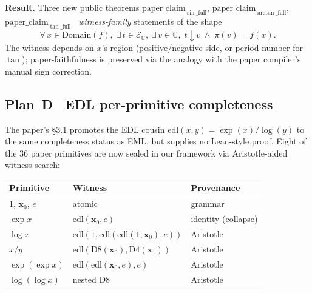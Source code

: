 \documentclass[11pt]{article}
\newcommand{\EsetC}{\mathcal{E}_{\mathbb{C}}}
\theoremstyle{plain}
\theoremstyle{definition}
\begin{document}
\noindent\textbf{Result.} Three new public theorems
$\mathrm{paper\_claim}_{\sin\_\mathrm{full}}$,
$\mathrm{paper\_claim}_{\arctan\_\mathrm{full}}$,
$\mathrm{paper\_claim}_{\tan\_\mathrm{full}}$ \textemdash\
\emph{witness-family} statements of the shape
\[
  \forall\, x \in \mathrm{Domain}(f),\;
  \exists\, t \in \EsetC,\;
  \exists\, v \in \mathbb{C},\;
  t \downarrow v \;\wedge\; \pi(v) = f(x).
\]
The witness depends on $x$'s region (positive/negative side, or
period number for $\tan$); paper-faithfulness is preserved via the
analogy with the paper compiler's manual sign correction.

\subsection*{Plan~D \textemdash\ EDL per-primitive completeness}

The paper's \S3.1 promotes the EDL cousin
$\mathrm{edl}(x, y) = \exp(x) / \log(y)$ to the same completeness
status as EML, but supplies no Lean-style proof. Eight of the $36$
paper primitives are now sealed in our framework via Aristotle-aided
witness search:

\begin{center}
\begin{tabular}{l l l}
\toprule
\textbf{Primitive} & \textbf{Witness} & \textbf{Provenance} \\
\midrule
$1$, $\mathbf{x}_0$, $e$       & atomic                                                         & grammar \\
$\exp x$                       & $\mathrm{edl}(\mathbf{x}_0, e)$                                & identity (collapse) \\
$\log x$                       & $\mathrm{edl}(1, \mathrm{edl}(\mathrm{edl}(1, \mathbf{x}_0), e))$ & Aristotle \\
$x / y$                        & $\mathrm{edl}(\mathrm{D8}(\mathbf{x}_0), \mathrm{D4}(\mathbf{x}_1))$ & Aristotle \\
$\exp(\exp x)$                 & $\mathrm{edl}(\mathrm{edl}(\mathbf{x}_0, e), e)$              & Aristotle \\
$\log(\log x)$                 & nested D8                                                       & Aristotle \\
\bottomrule
\end{tabular}
\end{center}
\end{document}
